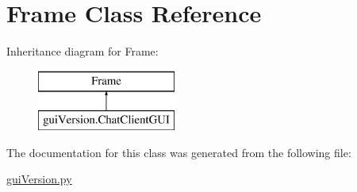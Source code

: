 \hypertarget{class_frame}{}\section{Frame Class Reference}
\label{class_frame}
Inheritance diagram for Frame\+:\begin{figure}[H]
\begin{center}
\leavevmode
\includegraphics[height=2.000000cm]{class_frame}
\end{center}
\end{figure}


The documentation for this class was generated from the following file\+:\begin{DoxyCompactItemize}
\item 
\hyperlink{gui_version_8py}{gui\+Version.\+py}\end{DoxyCompactItemize}
